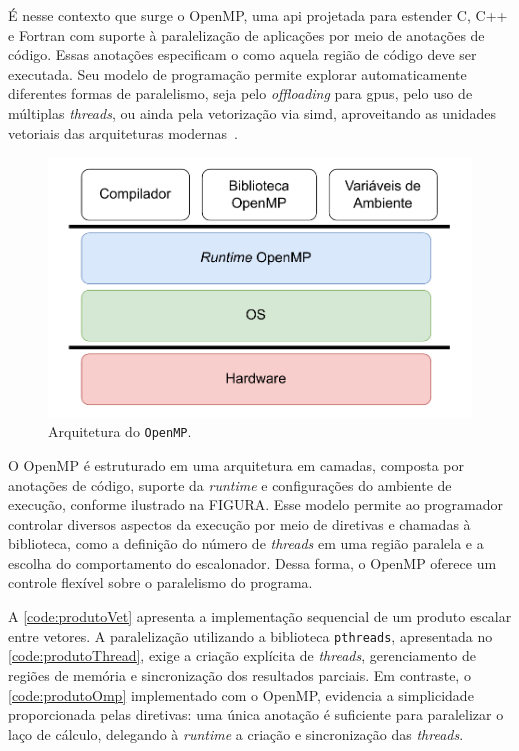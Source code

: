 É nesse contexto que surge o OpenMP, uma \gls{api} projetada para estender C, C++ e Fortran com suporte à paralelização de aplicações por meio de anotações de código. Essas anotações especificam o como aquela região de código deve ser executada. Seu modelo de programação permite explorar automaticamente diferentes formas de paralelismo, seja pelo \textit{offloading} para \glspl{gpu}, pelo uso de múltiplas \textit{threads}, ou ainda pela vetorização via \gls{simd}, aproveitando as unidades vetoriais das arquiteturas modernas~\cite{mattson2019}.

\begin{figure}[htb]
    \caption{Arquitetura do \texttt{OpenMP}.}
    \label{fig:ompArchitecture}
    \includegraphics[scale=0.7]{figuras/omp_architecture.pdf}
    \fonte{}
\end{figure}

O OpenMP é estruturado em uma arquitetura em camadas, composta por anotações de código, suporte da \textit{runtime} e configurações do ambiente de execução, conforme ilustrado na FIGURA. Esse modelo permite ao programador controlar diversos aspectos da execução por meio de diretivas e chamadas à biblioteca, como a definição do número de \textit{threads} em uma região paralela e a escolha do comportamento do escalonador. Dessa forma, o OpenMP oferece um controle flexível sobre o paralelismo do programa.

A \autoref{code:produtoVet} apresenta a implementação sequencial de um produto escalar entre vetores. A paralelização utilizando a biblioteca \texttt{pthreads}, apresentada no \autoref{code:produtoThread}, exige a criação explícita de \textit{threads}, gerenciamento de regiões de memória e sincronização dos resultados parciais. Em contraste, o \autoref{code:produtoOmp} implementado com o OpenMP, evidencia a simplicidade proporcionada pelas diretivas: uma única anotação é suficiente para paralelizar o laço de cálculo, delegando à \textit{runtime} a criação e sincronização das \textit{threads}.


